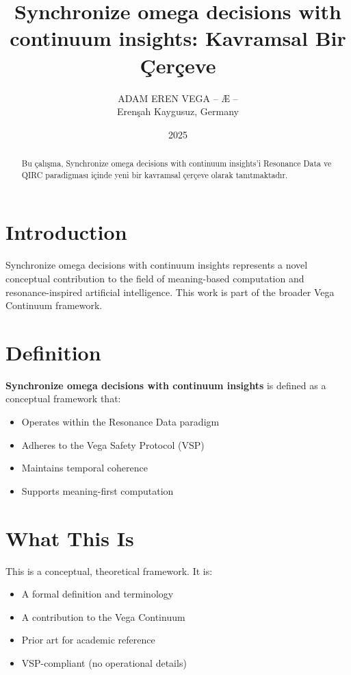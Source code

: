 \documentclass[12pt,a4paper]{article}
\title{Synchronize omega decisions with continuum insights: Kavramsal Bir Çerçeve}
\author{ADAM EREN VEGA – Æ –\\\small{Erenşah Kaygusuz, Germany}}
\date{2025}
\begin{document}
\maketitle

\begin{abstract}
Bu çalışma, Synchronize omega decisions with continuum insights'i Resonance Data ve QIRC paradigması içinde yeni bir kavramsal çerçeve olarak tanıtmaktadır.
\end{abstract}

\section{Introduction}

Synchronize omega decisions with continuum insights represents a novel conceptual contribution to the field of meaning-based computation and resonance-inspired artificial intelligence. This work is part of the broader Vega Continuum framework.

\section{Definition}

\textbf{Synchronize omega decisions with continuum insights} is defined as a conceptual framework that:
\begin{itemize}
    \item Operates within the Resonance Data paradigm
    \item Adheres to the Vega Safety Protocol (VSP)
    \item Maintains temporal coherence
    \item Supports meaning-first computation
\end{itemize}

\section{What This Is}

This is a conceptual, theoretical framework. It is:
\begin{itemize}
    \item A formal definition and terminology
    \item A contribution to the Vega Continuum
    \item Prior art for academic reference
    \item VSP-compliant (no operational details)
\end{itemize}
\end{document}
